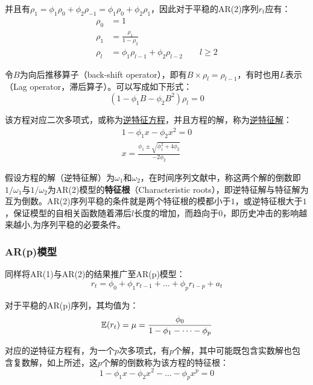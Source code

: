 \documentclass[11pt]{article}
\begin{document}
并且有$\rho_1 = \phi_1 \rho_{0} + \phi_2 \rho_{-1} = \phi_1 \rho_{0} + \phi_2 \rho_{1} $，因此对于平稳的AR(2)序列$r_t$应有：
\begin{align*}
    \rho_0 &= 1 \\
    \rho_1 &= \frac{\rho_1}{1-\rho_2} \\
    \rho_l &= \phi_1 \rho_{l-1} + \phi_2 \rho_{l-2} \qquad l \geq 2
\end{align*}

令$B$为向后推移算子（back-shift operator），即有$B \times \rho_l = \rho_{l-1}$，有时也用$L$表示（Lag operator，滞后算子）。可以写成如下形式：
\begin{equation*}
    (1-\phi_1 B - \phi_2 B^2)\rho_l = 0
\end{equation*}

该方程对应二次多项式，或称为\uline{逆特征方程}，并且方程的解，称为\uline{逆特征解}：
\begin{gather*}
    1 - \phi_1 x - \phi_2 x^2 = 0 \\
    x = \frac{\phi_1 \pm \sqrt{\phi_{1}^{2} + 4\phi_2}}{-2\phi_2}
\end{gather*}

假设方程的解（逆特征解）为$\omega_1$和$\omega_2$，在时间序列文献中，称这两个解的倒数即$1/\omega_1$与$1/\omega_2$为AR(2)模型的\textbf{特征根}（Characteristic roots），即逆特征解与特征解为互为倒数。AR(2)序列平稳的条件就是两个特征根的模都小于$1$，或逆特征根大于$1$，保证模型的自相关函数随着滞后$l$长度的增加，而趋向于$0$，即历史冲击的影响越来越小,为序列平稳的必要条件。

\subsubsection*{AR(p)模型}

同样将AR(1)与AR(2)的结果推广至AR(p)模型：
\begin{equation*}
    r_t = \phi_0 + \phi_1 r_{t-1} + \dots + \phi_p r_{t-p} + a_t
\end{equation*}

对于平稳的AR(p)序列，其均值为：
\begin{equation*}
    \mathbb{E}(r_t) = \mu = \frac{\phi_0}{1 - \phi_1 - \dots - \phi_p}
\end{equation*}

对应的逆特征方程有，为一个$p$次多项式，有$p$个解，其中可能既包含实数解也包含复数解，如上所述，这$p$个解的倒数称为该方程的特征根：
\begin{equation*}
    1 - \phi_1 x - \phi_2 x^2 - \dots - \phi_p x^p= 0
\end{equation*}
\end{document}
